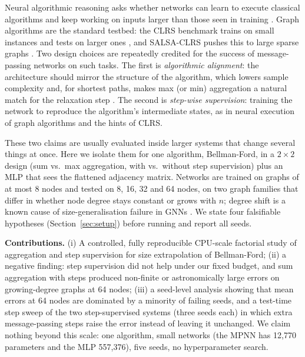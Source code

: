 Neural algorithmic reasoning asks whether networks can learn to execute classical algorithms and keep working on inputs larger than those seen in training \cite{velikovi2021neural}. Graph algorithms are the standard testbed: the CLRS benchmark trains on small instances and tests on larger ones \cite{velikovi2022clrs}, and SALSA-CLRS pushes this to large sparse graphs \cite{minder2023salsa}. Two design choices are repeatedly credited for the success of message-passing networks on such tasks. The first is \emph{algorithmic alignment}: the architecture should mirror the structure of the algorithm, which lowers sample complexity \cite{xu2019what} and, for shortest paths, makes max (or min) aggregation a natural match for the relaxation step \cite{xu2020how,dudzik2022graph}. The second is \emph{step-wise supervision}: training the network to reproduce the algorithm's intermediate states, as in neural execution of graph algorithms \cite{velikovi2019neural} and the hints of CLRS.

These two claims are usually evaluated inside larger systems that change several things at once. Here we isolate them for one algorithm, Bellman-Ford, in a $2\times2$ design (sum vs.\ max aggregation, with vs.\ without step supervision) plus an MLP that sees the flattened adjacency matrix. Networks are trained on graphs of at most 8 nodes and tested on 8, 16, 32 and 64 nodes, on two graph families that differ in whether node degree stays constant or grows with $n$; degree shift is a known cause of size-generalisation failure in GNNs \cite{yehudai2020from}. We state four falsifiable hypotheses (Section~\ref{sec:setup}) before running and report all seeds.

\textbf{Contributions.} (i) A controlled, fully reproducible CPU-scale factorial study of aggregation and step supervision for size extrapolation of Bellman-Ford; (ii) a negative finding: step supervision did not help under our fixed budget, and sum aggregation with steps produced non-finite or astronomically large errors on growing-degree graphs at 64 nodes; (iii) a seed-level analysis showing that mean errors at 64 nodes are dominated by a minority of failing seeds, and a test-time step sweep of the two step-supervised systems (three seeds each) in which extra message-passing steps raise the error instead of leaving it unchanged. We claim nothing beyond this scale: one algorithm, small networks (the MPNN has 12,770 parameters and the MLP 557,376), five seeds, no hyperparameter search.
